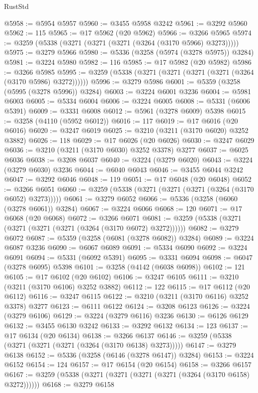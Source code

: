 \begin{lexlean}{RustStd}
\begin{coremodule}
@5958 := @5954 @5957
@5960 := @3455 @5958 @3242
@5961 := @3292 @5960
@5962 := 115
@5965 := @17 @5962 (@20 @5962)
@5966 := @3266 @5965
@5974 := @3259 (@5338 (@3271 (@3271 (@3271 (@3264 (@3170 @5966) @3273)))))
@5975 := @3279 @5966
@5980 := @5336 (@3258 (@5974 (@3278 @5975)) @3284)
@5981 := @3224 @5980
@5982 := 116
@5985 := @17 @5982 (@20 @5982)
@5986 := @3266 @5985
@5995 := @3259 (@5338 (@3271 (@3271 (@3271 (@3271 (@3264 (@3170 @5986) @3272))))))
@5996 := @3279 @5986
@6001 := @5359 (@3258 (@5995 (@3278 @5996)) @3284)
@6003 := @3224 @6001 @3236
@6004 := @5981 @6003
@6005 := @5334 @6004
@6006 := @3224 @6005
@6008 := @5331 (@6006 @5391)
@6009 := @3331 @6008
@6012 := @5961 (@3278 @6009) @5398
@6015 := @3258 (@4110 (@5952 @6012))
@6016 := 117
@6019 := @17 @6016 (@20 @6016)
@6020 := @3247 @6019
@6025 := @3210 (@3211 (@3170 @6020) @3252 @3882)
@6026 := 118
@6029 := @17 @6026 (@20 @6026)
@6030 := @3247 @6029
@6036 := @3210 (@3211 (@3170 @6030) @3252 @3378) @3277
@6037 := @6025 @6036
@6038 := @3208 @6037
@6040 := @3224 (@3279 @6020)
@6043 := @3224 (@3279 @6030) @3236
@6044 := @6040 @6043
@6046 := @3455 @6044 @3242
@6047 := @3292 @6046
@6048 := 119
@6051 := @17 @6048 (@20 @6048)
@6052 := @3266 @6051
@6060 := @3259 (@5338 (@3271 (@3271 (@3271 (@3264 (@3170 @6052) @3273)))))
@6061 := @3279 @6052
@6066 := @5336 (@3258 (@6060 (@3278 @6061)) @3284)
@6067 := @3224 @6066
@6068 := 120
@6071 := @17 @6068 (@20 @6068)
@6072 := @3266 @6071
@6081 := @3259 (@5338 (@3271 (@3271 (@3271 (@3271 (@3264 (@3170 @6072) @3272))))))
@6082 := @3279 @6072
@6087 := @5359 (@3258 (@6081 (@3278 @6082)) @3284)
@6089 := @3224 @6087 @3236
@6090 := @6067 @6089
@6091 := @5334 @6090
@6092 := @3224 @6091
@6094 := @5331 (@6092 @5391)
@6095 := @3331 @6094
@6098 := @6047 (@3278 @6095) @5398
@6101 := @3258 (@4142 (@6038 @6098))
@6102 := 121
@6105 := @17 @6102 (@20 @6102)
@6106 := @3247 @6105
@6111 := @3210 (@3211 (@3170 @6106) @3252 @3882)
@6112 := 122
@6115 := @17 @6112 (@20 @6112)
@6116 := @3247 @6115
@6122 := @3210 (@3211 (@3170 @6116) @3252 @3378) @3277
@6123 := @6111 @6122
@6124 := @3208 @6123
@6126 := @3224 (@3279 @6106)
@6129 := @3224 (@3279 @6116) @3236
@6130 := @6126 @6129
@6132 := @3455 @6130 @3242
@6133 := @3292 @6132
@6134 := 123
@6137 := @17 @6134 (@20 @6134)
@6138 := @3266 @6137
@6146 := @3259 (@5338 (@3271 (@3271 (@3271 (@3264 (@3170 @6138) @3273)))))
@6147 := @3279 @6138
@6152 := @5336 (@3258 (@6146 (@3278 @6147)) @3284)
@6153 := @3224 @6152
@6154 := 124
@6157 := @17 @6154 (@20 @6154)
@6158 := @3266 @6157
@6167 := @3259 (@5338 (@3271 (@3271 (@3271 (@3271 (@3264 (@3170 @6158) @3272))))))
@6168 := @3279 @6158

\end{coremodule}
\end{lexlean}

